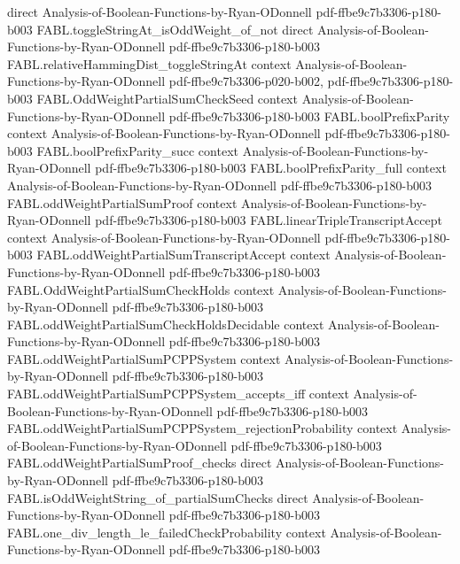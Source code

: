 \begin{theorem}
  {direct}
  {Analysis-of-Boolean-Functions-by-Ryan-ODonnell}
  {pdf-ffbe9c7b3306-p180-b003}
\proofstep
  {FABL.toggleStringAt_isOddWeight_of_not}
  {direct}
  {Analysis-of-Boolean-Functions-by-Ryan-ODonnell}
  {pdf-ffbe9c7b3306-p180-b003}
\proofstep
  {FABL.relativeHammingDist_toggleStringAt}
  {context}
  {Analysis-of-Boolean-Functions-by-Ryan-ODonnell}
  {pdf-ffbe9c7b3306-p020-b002,
    pdf-ffbe9c7b3306-p180-b003}
\proofstep
  {FABL.OddWeightPartialSumCheckSeed}
  {context}
  {Analysis-of-Boolean-Functions-by-Ryan-ODonnell}
  {pdf-ffbe9c7b3306-p180-b003}
\proofstep
  {FABL.boolPrefixParity}
  {context}
  {Analysis-of-Boolean-Functions-by-Ryan-ODonnell}
  {pdf-ffbe9c7b3306-p180-b003}
\proofstep
  {FABL.boolPrefixParity_succ}
  {context}
  {Analysis-of-Boolean-Functions-by-Ryan-ODonnell}
  {pdf-ffbe9c7b3306-p180-b003}
\proofstep
  {FABL.boolPrefixParity_full}
  {context}
  {Analysis-of-Boolean-Functions-by-Ryan-ODonnell}
  {pdf-ffbe9c7b3306-p180-b003}
\proofstep
  {FABL.oddWeightPartialSumProof}
  {context}
  {Analysis-of-Boolean-Functions-by-Ryan-ODonnell}
  {pdf-ffbe9c7b3306-p180-b003}
\proofstep
  {FABL.linearTripleTranscriptAccept}
  {context}
  {Analysis-of-Boolean-Functions-by-Ryan-ODonnell}
  {pdf-ffbe9c7b3306-p180-b003}
\proofstep
  {FABL.oddWeightPartialSumTranscriptAccept}
  {context}
  {Analysis-of-Boolean-Functions-by-Ryan-ODonnell}
  {pdf-ffbe9c7b3306-p180-b003}
\proofstep
  {FABL.OddWeightPartialSumCheckHolds}
  {context}
  {Analysis-of-Boolean-Functions-by-Ryan-ODonnell}
  {pdf-ffbe9c7b3306-p180-b003}
\proofstep
  {FABL.oddWeightPartialSumCheckHoldsDecidable}
  {context}
  {Analysis-of-Boolean-Functions-by-Ryan-ODonnell}
  {pdf-ffbe9c7b3306-p180-b003}
\proofstep
  {FABL.oddWeightPartialSumPCPPSystem}
  {context}
  {Analysis-of-Boolean-Functions-by-Ryan-ODonnell}
  {pdf-ffbe9c7b3306-p180-b003}
\proofstep
  {FABL.oddWeightPartialSumPCPPSystem_accepts_iff}
  {context}
  {Analysis-of-Boolean-Functions-by-Ryan-ODonnell}
  {pdf-ffbe9c7b3306-p180-b003}
\proofstep
  {FABL.oddWeightPartialSumPCPPSystem_rejectionProbability}
  {context}
  {Analysis-of-Boolean-Functions-by-Ryan-ODonnell}
  {pdf-ffbe9c7b3306-p180-b003}
\proofstep
  {FABL.oddWeightPartialSumProof_checks}
  {direct}
  {Analysis-of-Boolean-Functions-by-Ryan-ODonnell}
  {pdf-ffbe9c7b3306-p180-b003}
\proofstep
  {FABL.isOddWeightString_of_partialSumChecks}
  {direct}
  {Analysis-of-Boolean-Functions-by-Ryan-ODonnell}
  {pdf-ffbe9c7b3306-p180-b003}
\proofstep
  {FABL.one_div_length_le_failedCheckProbability}
  {context}
  {Analysis-of-Boolean-Functions-by-Ryan-ODonnell}
  {pdf-ffbe9c7b3306-p180-b003}

\end{theorem}
